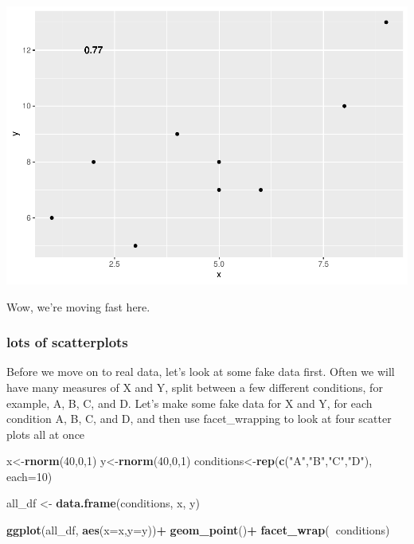 \documentclass[]{book}
\newenvironment{Shaded}{\begin{snugshade}}{\end{snugshade}}
\newcommand{\KeywordTok}[1]{\textcolor[rgb]{0.13,0.29,0.53}{\textbf{#1}}}
\newcommand{\DataTypeTok}[1]{\textcolor[rgb]{0.13,0.29,0.53}{#1}}
\newcommand{\DecValTok}[1]{\textcolor[rgb]{0.00,0.00,0.81}{#1}}
\newcommand{\StringTok}[1]{\textcolor[rgb]{0.31,0.60,0.02}{#1}}
\newcommand{\OperatorTok}[1]{\textcolor[rgb]{0.81,0.36,0.00}{\textbf{#1}}}
\newcommand{\NormalTok}[1]{#1}
\begin{document}
\includegraphics{Statistics_Lab_files/figure-latex/unnamed-chunk-66-1.pdf}

Wow, we're moving fast here.

\subsubsection{lots of scatterplots}\label{lots-of-scatterplots}

Before we move on to real data, let's look at some fake data first.
Often we will have many measures of X and Y, split between a few
different conditions, for example, A, B, C, and D. Let's make some fake
data for X and Y, for each condition A, B, C, and D, and then use
facet\_wrapping to look at four scatter plots all at once

\begin{Shaded}
\begin{Highlighting}[]
\NormalTok{x<-}\KeywordTok{rnorm}\NormalTok{(}\DecValTok{40}\NormalTok{,}\DecValTok{0}\NormalTok{,}\DecValTok{1}\NormalTok{)}
\NormalTok{y<-}\KeywordTok{rnorm}\NormalTok{(}\DecValTok{40}\NormalTok{,}\DecValTok{0}\NormalTok{,}\DecValTok{1}\NormalTok{)}
\NormalTok{conditions<-}\KeywordTok{rep}\NormalTok{(}\KeywordTok{c}\NormalTok{(}\StringTok{"A"}\NormalTok{,}\StringTok{"B"}\NormalTok{,}\StringTok{"C"}\NormalTok{,}\StringTok{"D"}\NormalTok{), }\DataTypeTok{each=}\DecValTok{10}\NormalTok{)}

\NormalTok{all_df <-}\StringTok{ }\KeywordTok{data.frame}\NormalTok{(conditions, x, y)}

\KeywordTok{ggplot}\NormalTok{(all_df, }\KeywordTok{aes}\NormalTok{(}\DataTypeTok{x=}\NormalTok{x,}\DataTypeTok{y=}\NormalTok{y))}\OperatorTok{+}
\StringTok{  }\KeywordTok{geom_point}\NormalTok{()}\OperatorTok{+}
\StringTok{  }\KeywordTok{facet_wrap}\NormalTok{(}\OperatorTok{~}\NormalTok{conditions)}
\end{Highlighting}
\end{Shaded}
\end{document}
